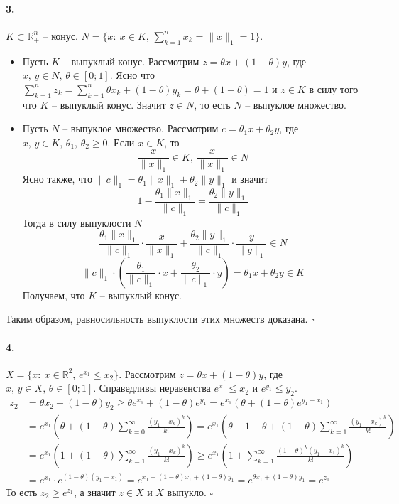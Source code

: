 \documentclass{article}
\newcommand*{\QED}{\null\nobreak\hfill\ensuremath{\square}}%
\newcommand*{\R}{\mathbb{R}}
\begin{document}
\paragraph{3.} $ K \subset \R_+^n $ -- конус. $ N = \{ x :\: x \in K,\, \sum\limits_{k = 1}^n x_k = \| x \|_1 = 1 \} $.
\begin{itemize}
    \item Пусть $K$ -- выпуклый конус. Рассмотрим $ z = \theta x + (1 - \theta) y $, где $ x,\, y \in N,\, \theta \in [0; 1] $. Ясно что $ \sum\limits_{k = 1}^n z_k = \sum\limits_{k = 1}^n \theta x_k + (1 - \theta) y_k = \theta + (1 - \theta) = 1 $ и $ z \in K $ в силу того что $K$ -- выпуклый конус. Значит $ z \in N $, то есть $N$ -- выпуклое множество.
    \item Пусть $N$ -- выпуклое множество. Рассмотрим $c = \theta_1 x + \theta_2 y$, где $x,\, y \in K,\, \theta_1,\, \theta_2 \geqslant 0$. Если $x \in K$, то 
        \[ \frac{x}{\| x \|_1} \in K,\, \frac{x}{\| x \|_1} \in N \]
        Ясно также, что $\|c\|_1 = \theta_1 \|x\|_1 + \theta_2 \|y\|_1$ и значит
        \[ 1 - \frac{\theta_1 \|x\|_1}{\|c\|_1} = \frac{\theta_2 \|y\|_1}{\|c\|_1} \]
        Тогда в силу выпуклости $N$
        \[ \frac{\theta_1 \|x\|_1}{\|c\|_1} \cdot \frac{x}{\|x\|_1} + \frac{\theta_2 \|y\|_1}{\|c\|_1} \cdot \frac{y}{\|y\|_1} \in N \]
        \[ \|c\|_1 \cdot \left( \frac{\theta_1}{\|c\|_1} \cdot x + \frac{\theta_2}{\|c\|_1} \cdot y \right) = \theta_1 x + \theta_2 y \in K \]
        Получаем, что $K$ -- выпуклый конус.
\end{itemize}
Таким образом, равносильность выпуклости этих множеств доказана. \QED


\paragraph{4.} $ X = \{ x :\: x \in \R^2,\, e^{x_1} \leqslant x_2 \} $. Рассмотрим $z = \theta x + (1 - \theta) y$, где $ x,\, y \in X,\, \theta \in [0; 1] $. Справедливы неравенства $ e^{x_1} \leqslant x_2 $ и $ e^{y_1} \leqslant y_2 $. 
\begin{equation*}
\begin{aligned}
    z_2 &= \theta x_2 + (1 - \theta) y_2 \geqslant \theta e^{x_1} + (1 - \theta) e^{y_1} = e^{x_1} \left( \theta + (1 - \theta) e^{y_1 - x_1} \right) \\
    &= e^{x_1} \left( \theta + (1 - \theta) \sum\limits_{k = 0}^\infty \frac{(y_1 - x_k)^k}{k!} \right) = e^{x_1} \left( \theta + 1 - \theta + (1 - \theta) \sum\limits_{k = 1}^\infty \frac{(y_1 - x_k)^k}{k!} \right) \\ 
    &= e^{x_1} \left( 1 + (1 - \theta) \sum\limits_{k = 1}^\infty \frac{(y_1 - x_k)^k}{k!} \right) \geqslant e^{x_1} \left( 1 + \sum\limits_{k = 1}^\infty \frac{(1 - \theta)^k (y_1 - x_1)^k}{k!} \right) \\
    &= e^{x_1} \cdot e^{(1 - \theta) (y_1 - x_1)} = e^{x_1 - (1 - \theta) x_1 + (1 - \theta) y_1} = e^{\theta x_1 + (1 - \theta) y_1} = e^{z_1} 
\end{aligned}
\end{equation*}
То есть $z_2 \geqslant e^{z_1}$, а значит $ z \in X $ и $X$ выпукло. \QED
\end{document}
